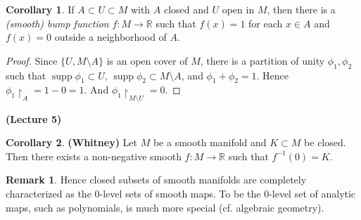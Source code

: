 \documentclass[10pt,letterpaper,cm]{nupset}
\theoremstyle{definition}
\newtheorem{remark}{Remark}
\newtheorem{corollary}{Corollary}
\newcommand{\R}{\mathbb R}
\newcommand{\1}{\mathbf{1}}
\newcommand{\0}{\vec 0}
\DeclareMathOperator{\supp}{supp}
\begin{document}
\begin{corollary}
If $A \subset U \subset M$ with $A$ closed and $U$ open in $M$, then there is a  \textit{(smooth) bump function} $f: M \to \R$ such that $f(x) = 1$ for each $x\in A$ and $f(x) =0$ outside a neighborhood of $A$.
\end{corollary}

\begin{proof}
Since $\{U, M \setminus A\}$ is an open cover of $M$, there is a partition of unity $\phi_1, \phi_2$ such that $\supp \phi_1 \subset U$, $\supp \phi_2 \subset M \setminus A$, and $\phi_1 + \phi_2 = 1$. Hence $\phi_1 \restriction_A = 1 - 0 = 1$. And $\phi_1 \restriction_{M\setminus U} = 0$.
\end{proof}

\begin{center}
{\textbf{(Lecture 5)}} 
\end{center}

\begin{corollary}{\textbf{(Whitney)}}
Let $M$ be a smooth manifold and $K \subset M$ be closed. Then there exists a non-negative smooth $f: M \to \R$ such that $f^{-1}(0) =K$.
\end{corollary}

\begin{remark}
Hence closed subsets of smooth manifolds are completely characterized as the $0$-level sets of smooth maps. To be the $0$-level set of analytic maps, such as polynomials, is much more special (cf. algebraic geometry).
\end{remark}
\end{document}

